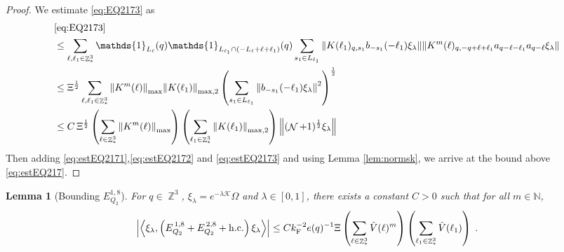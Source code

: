 \documentclass[12pt,a4paper]{article}
\numberwithin{equation}{section}
\newcommand{\cK}{\mathcal{K}}
\newcommand{\NNN}{\mathbb{N}}
\newcommand{\1}{\mathbb{I}}
\newcommand{\F}{\mathrm{F}}
\DeclareMathOperator{\Z}{\mathbb{Z}}
\DeclareMathOperator{\NN}{\mathcal{N}}
\newcommand{\half}{\frac{1}{2}}
\newcommand{\eva}[1]{\left\langle #1 \right\rangle}
\theoremstyle{plain}
\newtheorem{lemma}[theorem]{Lemma}
\theoremstyle{definition}
\theoremstyle{remark}
\theoremstyle{plain}
\theoremstyle{definition}
\theoremstyle{remark}
\begin{document}
\begin{proof}
We estimate \eqref{eq:EQ2173} as
\begin{align}
	&\eqref{eq:EQ2173}\nonumber\\
	&\leq\sum\limits_{\ell, \ell_1\in \Z^3_*} \mathds{1}_{L_{\ell}}(q) \mathds{1}_{L_{\ell_1}\cap (-L_{\ell}+\ell+\ell_1)}(q) \sum\limits_{s_1\in L_{\ell_1}} \norm{ K(\ell_1)_{q,s_1} b_{-s_1}(-\ell_1) \xi_\lambda}\norm{ K^m(\ell)_{q,-q+\ell+\ell_1} a_{q-\ell-\ell_1} a_{q-\ell} \xi_\lambda }\nonumber\\
	&\leq \Xi^\half \sum\limits_{\ell, \ell_1\in \Z^3_*} \norm{K^m(\ell)}_{\max} \norm{K(\ell_1)}_{\mathrm{max,2}} \left(\sum\limits_{s_1 \in L_{\ell_1}} \norm{ b_{-s_1}(-\ell_1) \xi_\lambda}^2\right)^\half  \nonumber\\ 
	&\leq C\, \Xi^\half \left(\sum\limits_{\ell \in \Z^3_*} \norm{K^m(\ell)}_{\max}\right)\left( \sum\limits_{\ell_1\in \Z^3_*} \norm{ K(\ell_1)}_{\mathrm{max,2}} \right) \norm{(\NN+1)^\half\xi_\lambda}\label{eq:estEQ2173}
\end{align}
Then adding \eqref{eq:estEQ2171},\eqref{eq:estEQ2172} and \eqref{eq:estEQ2173} and using Lemma \ref{lem:normsk}, we arrive at the bound above \eqref{eq:estEQ217}. 
\end{proof}


\begin{lemma}[Bounding $E_{Q_2}^{1,8}$]\label{lem:EQ218}
For $ q \in \Z^3 $, $\xi_\lambda = e^{-\lambda \cK} \Omega$ and $ \lambda \in [0,1] $, there exists a constant $ C > 0 $ such that for all $ m \in \NNN $,
\begin{align}
	\abs{\eva{\xi_\lambda,\left(E^{\,1,8}_{Q_2}+E^{\,2,8}_{Q_2}+\mathrm{h.c.}\right) \xi_\lambda }}
	\leq C k_{\F}^{-2} e(q)^{-1} \Xi \left(\sum\limits_{\ell \in \Z^3_*} \hat{V}(\ell)^m \right) \left(\sum\limits_{\ell_1 \in \Z^3_*} \hat{V}(\ell_1) \right) \;.\label{eq:estEQ218}  
\end{align}
\end{lemma}
\end{document}
